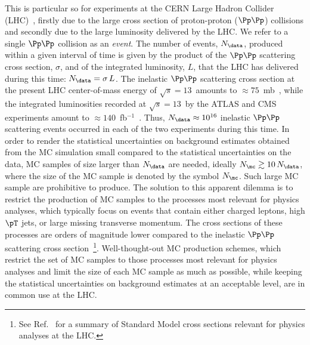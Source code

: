 This is particular so for experiments at the CERN Large Hadron Collider (LHC)~\cite{Bruning:2004ej,Buning:2004wk,Benedikt:2004wm},
firstly due to the large cross section of proton-proton ($\Pp\Pp$) collisions and secondly due to the large luminosity delivered by the LHC.
We refer to a single $\Pp\Pp$ collision as an {\em event}.
The number of events, $N_{\data}$, produced within a given interval of time 
is given by the product of the $\Pp\Pp$ scattering cross section, $\sigma$, and of the integrated luminosity, $L$, that the LHC has delivered during this time:
$N_{\data} = \sigma \, L$.
The inelastic $\Pp\Pp$ scattering cross section at the present LHC center-of-mass energy of $\sqrt{s}=13$~\TeV amounts to $\approx 75$~mb~\cite{Aaboud:2016mmw,Sirunyan:2018nqx},
while the integrated luminosities recorded at $\sqrt{s}=13$~\TeV by the ATLAS and CMS experiments amount to $\approx 140$~fb$^{-1}$~\cite{ATLAS-CONF-2019-021,LUM-17-001,LUM-17-004,LUM-18-002}.
Thus, $N_{\data} \approx 10^{16}$ inelastic $\Pp\Pp$ scattering events occurred in each of the two experiments during this time.
In order to render the statistical uncertainties on background estimates obtained from the MC simulation small compared to the statistical uncertainties on the data,
MC samples of size larger than $N_{\data}$ are needed, ideally $N_{\mc} \gtrsim 10 \, N_{\data}$,
where the size of the MC sample is denoted by the symbol $N_{\mc}$.
Such large MC sample are prohibitive to produce.
The solution to this apparent dilemma is to restrict the production of MC samples to the processes most relevant for physics analyses,
which typically focus on events that contain either charged leptons, high $\pT$ jets, or large missing transverse momentum.
The cross sections of these processes are orders of magnitude lower compared to the inelastic $\Pp\Pp$ scattering cross section~\footnote{ 
See Ref.~\cite{StandardModelCrossSections} for a summary of Standard Model cross sections relevant for physics analyses at the LHC.}.
Well-thought-out MC production schemes,
which restrict the set of MC samples to those processes most relevant for physics analyses
and limit the size of each MC sample as much as possible, 
while keeping the statistical uncertainties on background estimates at an acceptable level,
are in common use at the LHC.

